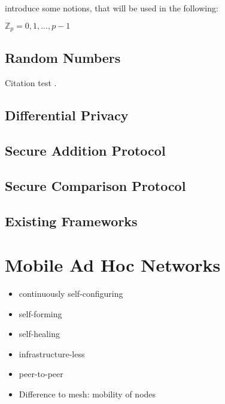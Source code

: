 		
		\textcite[p. ]{Cra:1} introduce some notions, that will be used in the following:
		
		$\mathbb{Z}_p={0,1,...,p-1}$
				
		
		
		\subsection*{Random Numbers}
		

		
		
		
		Citation test \autocite[pp. 35-37]{Cra:1}.

		\subsection*{Differential Privacy}
		
		\subsection*{Secure Addition Protocol}

		\subsection*{Secure Comparison Protocol}

		\subsection*{Existing Frameworks}
	
	\section{Mobile Ad Hoc Networks}
	
			{\color{gray} 
				\begin{itemize}  
					\item continuously self-configuring
					\item self-forming
					\item self-healing
					\item infrastructure-less
					\item peer-to-peer
					\item Difference to mesh: mobility of nodes
				\end{itemize}
			}
	
